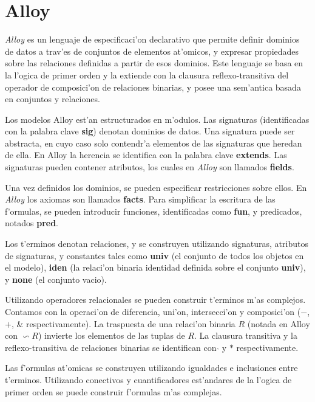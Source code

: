 \section{Alloy}

\textit{Alloy}\cite{alloy} es un lenguaje de especificaci'on declarativo que permite definir dominios de datos a trav'es de conjuntos de elementos at'omicos, y expresar propiedades sobre las relaciones definidas a partir de esos dominios. Este lenguaje se basa en la l'ogica de primer orden y la extiende con la clausura reflexo-transitiva del operador de composici'on de relaciones binarias, y posee una sem'antica basada en conjuntos y relaciones.

Los modelos Alloy est'an estructurados en m'odulos. Las signaturas (identificadas con la palabra clave \textbf{sig}) denotan dominios de datos. Una signatura puede ser abstracta, en cuyo caso solo contendr'a elementos de las signaturas que heredan de ella. En Alloy la herencia se identifica con la palabra clave \textbf{extends}. Las signaturas pueden contener atributos, los cuales en \textit{Alloy} son llamados \textbf{fields}.

Una vez definidos los dominios, se pueden especificar restricciones sobre ellos. En \textit{Alloy} los axiomas son llamados \textbf{facts}. Para simplificar la escritura de las f'ormulas, se pueden introducir funciones, identificadas como \textbf{fun}, y predicados, notados \textbf{pred}.

Los t'erminos denotan relaciones, y se construyen utilizando signaturas, atributos de signaturas, y constantes tales como \textbf{univ} (el conjunto de todos los objetos en el modelo), \textbf{iden} (la relaci'on binaria identidad definida sobre el conjunto \textbf{univ}), y \textbf{none} (el conjunto vacio).

Utilizando operadores relacionales se pueden construir t'erminos m'as complejos. Contamos con la operaci'on de diferencia, uni'on, intersecci'on y composici'on ($-$, $+$, $\&$ respectivamente). La traspuesta de una relaci'on binaria $R$ (notada en Alloy con $\backsim{R}$) invierte los elementos de las tuplas de $R$. La clausura transitiva y la reflexo-transitiva de relaciones binarias se identifican con  $\hat{}$ y $*$ respectivamente.

Las f'ormulas at'omicas se construyen utilizando igualdades e inclusiones entre t'erminos. Utilizando conectivos y cuantificadores est'andares de la l'ogica de primer orden se puede construir f'ormulas m'as complejas.

